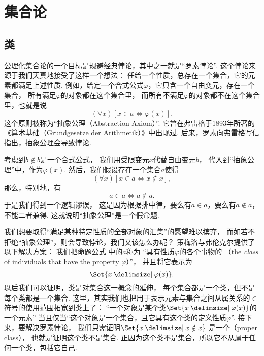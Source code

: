 \chapter{集合论}

\section{类}
公理化集合论的一个目标是规避经典悖论，其中之一就是“罗素悖论”.
这个悖论来源于我们天真地接受了这样一个想法：
任给一个性质，总存在一个集合，它的元素都满足上述性质.
例如，给定一个合式公式\(\varphi\)，它只含一个自由变元，存在一个集合，
所有满足\(\varphi\)的对象都在这个集合里，
而所有不满足\(\varphi\)的对象都不在这个集合里，也就是说
\begin{equation}\label{equation:集合论.类的逻辑表示}
	(\forall x)[x \in a \iff \varphi(x)].
\end{equation}
这个原则被称为“抽象公理（Abstraction Axiom）”.
它曾在弗雷格于1893年所著的《算术基础（Grundgesetze der Arithmetik）》中出现过.
后来，罗素向弗雷格写信指出，抽象公理会导致悖论.

考虑到\(b \notin b\)是一个合式公式，
我们用受限变元\(x\)代替自由变元\(b\)，
代入到“抽象公理”中，作为\(\varphi(x)\).
然后，我们假设存在一个集合\(a\)使得\[
	(\forall x)[x \in a \iff x \notin x],
\]
那么，特别地，有\[
	a \in a \iff a \notin a.
\]
于是我们得到一个逻辑谬误，
这是因为根据排中律，要么有\(a \in a\)，要么有\(a \notin a\)，不能二者兼得.
这就说明“抽象公理”是一个假命题.

我们想要取得“满足某种特定性质的全部对象的汇集”的愿望难以摈弃，
而如若不拒绝“抽象公理”，则会导致悖论，我们又该怎么办呢？
策梅洛与弗伦克尔提供了以下解决方案：
我们把命题公式  中的\(a\)称为%
“具有性质\(\varphi\)的各个事物的%
（the \emph{class} of individuals that have the property \(\varphi\)）”，
并且将它表示为
\begin{equation}
	\Set{ x \given \varphi(x) }.
\end{equation}
以后我们可以证明，类是对集合这一概念的延伸，
每个集合都是一个类，但不是每个类都是一个集合.
这里，其实我们也把用于表示元素与集合之间从属关系的\(\in\)符号的使用范围拓宽到类上了：
“一个对象是某个类\(\Set{ x \given \varphi(x) }\)的一个元素”%
当且仅当“这个对象是一个集合，且它具有这个类的定义性质\(\varphi\)”.
接下来，要解决罗素悖论，
我们只需证明\(\Set{ x \given x \notin x }\)%
是一个（proper class），
也就是证明这个类不是集合.
正因为这个类不是集合，所以它不从属于任何一个类，包括它自己.

